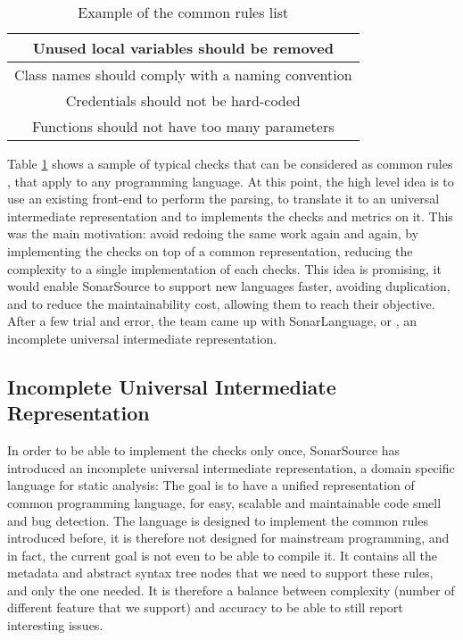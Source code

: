\begin{table}[h]
\centering
\caption{Example of the common rules list}
\label{table:common_rules}
	\begin{tabular}{|c|}
		\hline
		Unused local variables should be removed  \\ \hline
		Class names should comply with a naming convention \\ \hline
		Credentials should not be hard-coded \\ \hline
		Functions should not have too many parameters \\ \hline
	\end{tabular}
\end{table}

Table \ref{table:common_rules} shows a sample of typical checks that can be considered as common rules \cite{JiraSonarSource:2019:Online}, that apply to any programming language.
At this point, the high level idea is to use an existing front-end to perform the parsing, to translate it to an universal intermediate representation and to implements the checks and metrics on it.
This was the main motivation: avoid redoing the same work again and again, by implementing the checks on top of a common representation, reducing the complexity to a single implementation of each checks.
This idea is promising, it would enable SonarSource to support new languages faster, avoiding duplication, and to reduce the maintainability cost, allowing them to reach their objective.
After a few trial and error, the team came up with SonarLanguage, or \slang{}, an incomplete universal intermediate representation. 


\subsection{Incomplete Universal Intermediate Representation}
\label{subsec:slang}

In order to be able to implement the checks only once, SonarSource has introduced an incomplete universal intermediate representation, a domain specific language for static analysis: \textbf{\slang{}}
The goal is to have a unified representation of common programming language, for easy, scalable and maintainable code smell and bug detection. 
The language is designed to implement the common rules introduced before, it is therefore not designed for mainstream programming, and in fact, the current goal is not even to be able to compile it.
It contains all the metadata and abstract syntax tree nodes that we need to support these rules, and only the one needed.
It is therefore a balance between complexity (number of different feature that we support) and accuracy to be able to still report interesting issues. 

